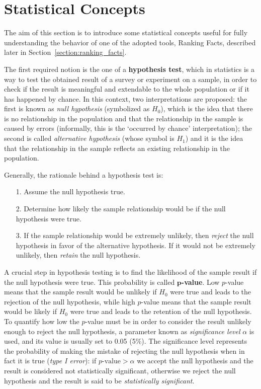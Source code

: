 \section{Statistical Concepts}
\label{section:statistical_concepts}
The aim of this section is to introduce some statistical concepts useful for fully understanding the behavior of one of the adopted tools, Ranking Facts, described later in Section~\ref{section:ranking_facts}.

The first required notion is the one of a \textbf{hypothesis test}, which in statistics is a way to test the obtained result of a survey or experiment on a sample, in order to check if the result is meaningful and extendable to the whole population or if it has happened by chance. In this context, two interpretations are proposed: the first is known as \textit{null hypothesis} (symbolized as \(H_0\)), which is the idea that there is no relationship in the population and that the relationship in the sample is caused by errors (informally, this is the `occurred by chance' interpretation); the second is called \textit{alternative hypothesis} (whose symbol is \(H_1\)) and it is the idea that the relationship in the sample reflects an existing relationship in the population.

Generally, the rationale behind a hypothesis test is:
\begin{itemize}
\item[1.] Assume the null hypothesis true.
\item[2.] Determine how likely the sample relationship would be if the null hypothesis were true.
\item[3.] If the sample relationship would be extremely unlikely, then \textit{reject} the null hypothesis in favor of the alternative hypothesis. If it would not be extremely unlikely, then \textit{retain} the null hypothesis.
\end{itemize}

A crucial step in hypothesis testing is to find the likelihood of the sample result if the null hypothesis were true. This probability is called \textbf{\(\bm{p}\)-value}. Low \(p\)-value means that the sample result would be unlikely if \(H_0\) were true and leads to the rejection of the null hypothesis, while high \(p\)-value means that the sample result would be likely if \(H_0\) were true and leads to the retention of the null hypothesis. To quantify how low the \(p\)-value must be in order to consider the result unlikely enough to reject the null hypothesis, a parameter known as \textit{significance level} \(\alpha\) is used, and its value is usually set to 0.05 (5\%). The significance level represents the probability of making the mistake of rejecting the null hypothesis when in fact it is true (\textit{type I error}): if \(p\textrm{-value} > \alpha\) we accept the null hypothesis and the result is considered not statistically significant, otherwise we reject the null hypothesis and the result is said to be \textit{statistically significant}.

